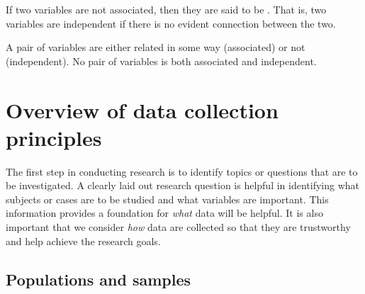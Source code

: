 If two variables are not associated, then they are said to be . That is, two variables are independent if there is no evident connection between the two.

\begin{termBox}{
A pair of variables are either related in some way (associated) or not (independent). No pair of variables is both associated and independent.}
\end{termBox}


\section{Overview of data collection principles}
\label{overviewOfDataCollectionPrinciples}


The first step in conducting research is to identify topics or questions that are to be investigated. A clearly laid out research question is helpful in identifying what subjects or cases are to be studied and what variables are important. This information provides a foundation for \emph{what} data will be helpful. It is also important that we consider \emph{how} data are collected so that they are trustworthy and help achieve the research goals. %

\subsection{Populations and samples}
\label{populationsAndSamples}

